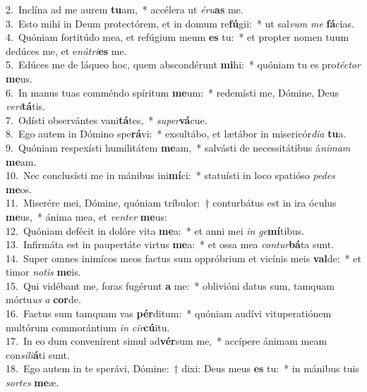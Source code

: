{2.~}Inclína ad me aurem \textbf{tu}am,~* accélera ut \textit{é}\textit{ru}\textbf{as} me.\\
{3.~}Esto mihi in Deum protectórem, et in domum re\textbf{fú}gii:~* ut sal\textit{vum} \textit{me} \textbf{fá}cias.\\
{4.~}Quóniam fortitúdo mea, et refúgium meum \textbf{es} tu:~* et propter nomen tuum dedúces me, et e\textit{nú}\textit{tri}\textbf{es} me.\\
{5.~}Edúces me de láqueo hoc, quem abscondérunt \textbf{mi}hi:~* quóniam tu es pro\textit{té}\textit{ctor} \textbf{me}us.\\
{6.~}In manus tuas comméndo spíritum \textbf{me}um:~* redemísti me, Dómine, Deus \textit{ve}\textit{ri}\textbf{tá}tis.\\
{7.~}Odísti observántes vani\textbf{tá}tes,~* \textit{su}\textit{per}\textbf{vá}cue.\\
{8.~}Ego autem in Dómino spe\textbf{rá}vi:~* exsultábo, et lætábor in misericór\textit{di}\textit{a} \textbf{tu}a.\\
{9.~}Quóniam respexísti humilitátem \textbf{me}am,~* salvásti de necessitátibus á\textit{ni}\textit{mam} \textbf{me}am.\\
{10.~}Nec conclusísti me in mánibus ini\textbf{mí}ci:~* statuísti in loco spatióso \textit{pe}\textit{des} \textbf{me}os.\\
{11.~}Miserére mei, Dómine, quóniam tríbulor:~† conturbátus est in ira óculus \textbf{me}us,~* ánima mea, et \textit{ven}\textit{ter} \textbf{me}us:\\
{12.~}Quóniam defécit in dolóre vita \textbf{me}a:~* et anni mei \textit{in} \textit{ge}\textbf{mí}tibus.\\
{13.~}Infirmáta est in paupertáte virtus \textbf{me}a:~* et ossa mea \textit{con}\textit{tur}\textbf{bá}ta sunt.\\
{14.~}Super omnes inimícos meos factus sum oppróbrium et vicínis meis \textbf{val}de:~* et timor \textit{no}\textit{tis} \textbf{me}is.\\
{15.~}Qui vidébant me, foras fugérunt \textbf{a} me:~* oblivióni datus sum, tamquam mórtu\textit{us} \textit{a} \textbf{cor}de.\\
{16.~}Factus sum tamquam vas \textbf{pér}ditum:~* quóniam audívi vituperatiónem multórum commorántium \textit{in} \textit{cir}\textbf{cú}itu.\\
{17.~}In eo dum convenírent simul ad\textbf{vér}sum me,~* accípere ánimam meam con\textit{si}\textit{li}\textbf{á}ti sunt.\\
{18.~}Ego autem in te sperávi, Dómine:~† dixi: Deus meus \textbf{es} tu:~* in mánibus tuis \textit{sor}\textit{tes} \textbf{me}æ.\\
